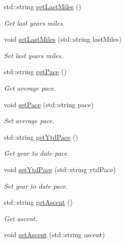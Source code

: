\begin{DoxyCompactItemize}
std\+::string \mbox{\hyperlink{classAthleteDataContainer_a30cf81a80f249aa3e81db1e0a712e33f}{get\+Last\+Miles}} ()
\begin{DoxyCompactList}\small\item\em Get last years miles. \end{DoxyCompactList}\item 
void \mbox{\hyperlink{classAthleteDataContainer_a1d459adc89cbc743be440bbbc162dddd}{set\+Last\+Miles}} (std\+::string last\+Miles)
\begin{DoxyCompactList}\small\item\em Set last years miles. \end{DoxyCompactList}\item 
std\+::string \mbox{\hyperlink{classAthleteDataContainer_a9176f9236ca28e4885da7359d7b62587}{get\+Pace}} ()
\begin{DoxyCompactList}\small\item\em Get average pace. \end{DoxyCompactList}\item 
void \mbox{\hyperlink{classAthleteDataContainer_a539a652697ef09f57f0460bebc7cf403}{set\+Pace}} (std\+::string pace)
\begin{DoxyCompactList}\small\item\em Set average pace. \end{DoxyCompactList}\item 
std\+::string \mbox{\hyperlink{classAthleteDataContainer_a8fd9730db3fab2070542226a09eba5ea}{get\+Ytd\+Pace}} ()
\begin{DoxyCompactList}\small\item\em Get year to date pace. \end{DoxyCompactList}\item 
void \mbox{\hyperlink{classAthleteDataContainer_a821352a815f156be80cb82b7cd6134c2}{set\+Ytd\+Pace}} (std\+::string ytd\+Pace)
\begin{DoxyCompactList}\small\item\em Set year to date pace. \end{DoxyCompactList}\item 
std\+::string \mbox{\hyperlink{classAthleteDataContainer_a655c028c325e6af60e79943738ef46fa}{get\+Ascent}} ()
\begin{DoxyCompactList}\small\item\em Get ascent. \end{DoxyCompactList}\item 
void \mbox{\hyperlink{classAthleteDataContainer_a5ac88d8d2c30423cbe91c5de730684d8}{set\+Ascent}} (std\+::string ascent)

\end{DoxyCompactItemize}
